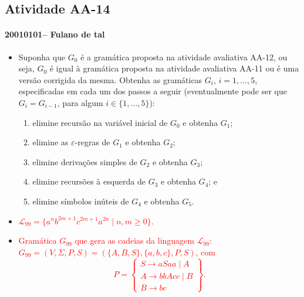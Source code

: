 \documentclass[12pt]{article}
\def\discente{Fulano de tal}
\def\matricula{20010101}
\def\aa{14}
\def\myling{{99}} %
\begin{document}
\subsection*{Atividade AA-\aa}
 \paragraph{\matricula -- \discente}
%
 \begin{itemize}
  \item Suponha que $G_0$ é a gramática proposta na atividade avaliativa AA-12, ou seja, $G_0$ é igual à gramática proposta na atividade avaliativa AA-11 ou é uma versão corrigida da mesma. Obtenha as gramáticas $G_i$, $i=1,\dots,5$, especificadas em cada um dos passos a seguir (eventualmente pode ser que $G_i=G_{i-1}$, para algum $i\in\{1,\dots,5\}$):
  \begin{enumerate}[topsep=-1pt,itemsep=0pt]
   \item elimine recursão na variável inicial de $G_0$ e obtenha $G_1$;
   \item elimine as $\varepsilon$-regras de $G_1$ e obtenha $G_2$;
   \item elimine derivações simples de $G_2$ e obtenha $G_3$;
   \item elimine recursões à esquerda de $G_3$ e obtenha $G_4$; e
   \item elimine símbolos inúteis de $G_4$ e obtenha $G_5$.
  \end{enumerate}
  
  \item \textcolor{red}{$\mathcal{L}_{\myling} = \{a^nb^{2m+1}c^{2m+1}a^{2n} \mid n,m \geqslant 0\}$.}
  \item  \textcolor{red}{Gramática $G_{\myling}$ que gera as cadeias da linguagem $\mathcal{L}_{\myling}$:\\ $G_{\myling}=(V,\Sigma,P,S)=(\{A,B,S\},\{a,b,c\},P,S)$, com
  $$
   P =
   \left\{\begin{array}{l}
    S\to aSaa\mid A\\
    A\to bbAcc\mid B\\
    B\to bc
   \end{array}\right\}.
  $$
  }
\end{itemize}
\end{document}
